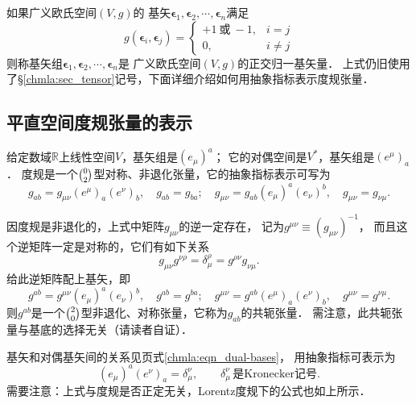 如果广义欧氏空间$(V,g)$的
基矢$\boldsymbol{\epsilon}_1,\boldsymbol{\epsilon}_2,\cdots,\boldsymbol{\epsilon}_n$满足
\begin{equation}\label{chdm:eqn_unitary-bases}
    g(\boldsymbol{\epsilon}_i,\boldsymbol{\epsilon}_j) = 
    \begin{cases}
        +1 \ \text{或} \ -1, & i=j \\
        0, & i \neq j
    \end{cases}
\end{equation}
则称基矢组$\boldsymbol{\epsilon}_1,\boldsymbol{\epsilon}_2,\cdots,\boldsymbol{\epsilon}_n$是
广义欧氏空间$(V,g)$的{\heiti 正交归一}基矢量．
上式仍旧使用了\S\ref{chmla:sec_tensor}记号，下面详细介绍如何用抽象指标表示度规张量．


\subsection{平直空间度规张量的表示}\label{chdm:sec_metric-abi}
给定数域$\mathbb{R}$上线性空间$V$，基矢组是$(e_\mu)^a$；
它的对偶空间是$V^*$，基矢组是$(e^\mu)_a$．
度规是一个$\binom{0}{2}$型对称、非退化张量，它的抽象指标表示可写为
\begin{equation}\label{chdm:eqn_Euclid-gab}
    g_{ab} = g_{\mu\nu} (e^\mu)_a (e^\nu)_b, \quad g_{ab} = g_{ba}; \quad
    g_{\mu\nu} = g_{ab} (e_\mu)^a (e_\nu)^b, \quad g_{\mu\nu} = g_{\nu\mu}.
\end{equation}

因度规是非退化的，上式中矩阵$g_{\mu\nu}$的逆一定存在，
记为$g^{\mu\nu}\equiv (g_{\mu\nu})^{-1}$，
而且这个逆矩阵一定是对称的，它们有如下关系
\begin{equation}
    g_{\mu\nu} g^{\nu\rho}= \delta_\mu ^\rho = g^{\rho\nu}g_{\nu\mu} . 
\end{equation}
给此逆矩阵配上基矢，即
\begin{equation}
     g^{ab} = g^{\mu\nu} (e_\mu)^a (e_\nu)^b, \quad g^{ab} = g^{ba}; \quad
     g^{\mu\nu} = g^{ab} (e^\mu)_a (e^\nu)_b, \quad g^{\mu\nu} = g^{\nu\mu}.
\end{equation}
则$g^{ab}$是一个$\binom{2}{0}$型非退化、对称张量，它称为$g_{ab}$的{\heiti 共轭张量}．
需注意，此共轭张量与基底的选择无关（请读者自证）．

基矢和对偶基矢间的关系见\pageref{chmla:eqn_dual-bases}页式\eqref{chmla:eqn_dual-bases}，
用抽象指标可表示为
\begin{equation}
    (e_\mu )^a (e^\nu)_a =\delta_\mu ^\nu, \qquad 
    \delta_\mu ^\nu \, \text{是Kronecker记号} .
\end{equation}
需要注意：上式与度规是否正定无关，Lorentz度规下的公式也如上所示．

